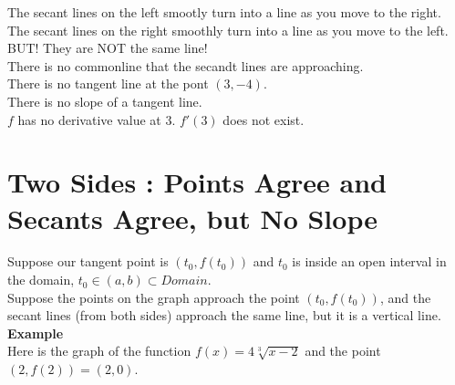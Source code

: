 \documentclass{ximera}
\begin{document}
The secant lines on the left smootly turn into a line as you move to the right. The secant lines on the right smoothly turn into a line as you move to the left. \\

BUT!  They are NOT the same line! \\


There is no commonline that the secandt lines are approaching. \\

There is no tangent line at the pont $(3,-4)$. \\

There is no slope of a tangent line. \\

$f$ has no derivative value at $3$.  $f'(3)$ does not exist.

































\section{Two Sides : Points Agree and Secants Agree, but No Slope}


Suppose our tangent point is $(t_0 , f(t_0))$ and $t_0$ is inside an open interval in the domain, $t_0 \in (a, b) \subset Domain$. \\


Suppose the points on the graph approach the point $(t_0 , f(t_0))$, and the secant lines (from both sides) approach the same line, but it is a vertical line. \\



\textbf{\textcolor{blue!55!black}{Example}}  \\




Here is the graph of the function $f(x) = 4 \sqrt[3]{x-2}$ and the point $(2, f(2))= (2, 0)$. \\
\end{document}
